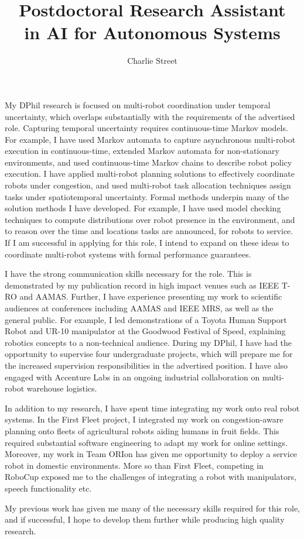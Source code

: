 \documentclass[12pt]{article}
\title{Postdoctoral Research Assistant \\in AI for Autonomous Systems}
\date{}
\author{Charlie Street}
\begin{document}
\maketitle
\thispagestyle{empty}

My DPhil research is focused on multi-robot coordination under temporal uncertainty, which overlaps substantially with the requirements of the advertised role.
%
Capturing temporal uncertainty requires continuous-time Markov models.
%
For example, I have used Markov automata to capture asynchronous multi-robot execution in continuous-time, extended Markov automata for non-stationary environments, and used continuous-time Markov chains to describe robot policy execution.
%
I have applied multi-robot planning solutions to effectively coordinate robots under congestion, and used multi-robot task allocation techniques assign tasks under spatiotemporal uncertainty.
%
Formal methods underpin many of the solution methods I have developed.
%
For example, I have used model checking techniques to compute distributions over robot presence in the environment, and to reason over the time and locations tasks are announced, for robots to service.
%
If I am successful in applying for this role, I intend to expand on these ideas to coordinate multi-robot systems with formal performance guarantees.

I have the strong communication skills necessary for the role.
%
This is demonstrated by my publication record in high impact venues such as IEEE T-RO and AAMAS.
%
Further, I have experience presenting my work to scientific audiences at conferences including AAMAS and IEEE MRS, as well as the general public.
%
For example, I led demonstrations of a Toyota Human Support Robot and UR-10 manipulator at the Goodwood Festival of Speed, explaining robotics concepts to a non-technical audience.
%
During my DPhil, I have had the opportunity to supervise four undergraduate projects, which will prepare me for the increased supervision responsibilities in the advertised position.
%
I have also engaged with Accenture Labs in an ongoing industrial collaboration on multi-robot warehouse logistics.

In addition to my research, I have spent time integrating my work onto real robot systems.
%
In the First Fleet project, I integrated my work on congestion-aware planning onto fleets of agricultural robots aiding humans in fruit fields.
%
This required substantial software engineering to adapt my work for online settings.
%
Moreover, my work in Team ORIon has given me opportunity to deploy a service robot in domestic environments.
%
More so than First Fleet, competing in RoboCup exposed me to the challenges of integrating a robot with manipulators, speech functionality etc.

My previous work has given me many of the necessary skills required for this role, and if successful, I hope to develop them further while producing high quality research.
\end{document}

